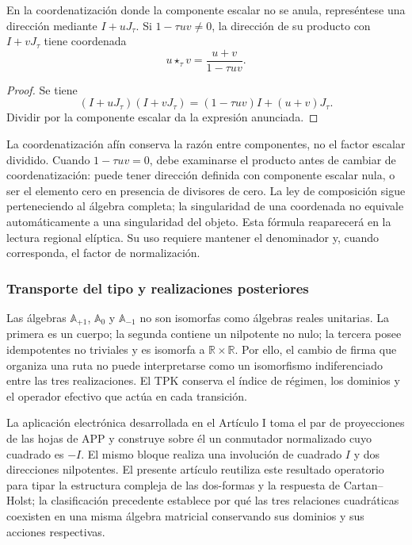 \begin{proposition}
\label{trit-ampl-prop-pendientes}
En la coordenatización donde la componente escalar no se anula, represéntese una
dirección mediante \(I+uJ_\tau\). Si \(1-\tau uv\ne0\), la dirección de su
producto con \(I+vJ_\tau\) tiene coordenada
\[
 u\star_\tau v=\frac{u+v}{1-\tau uv}.
\]
\end{proposition}
\begin{proof}
Se tiene
\[
 (I+uJ_\tau)(I+vJ_\tau)
   =(1-\tau uv)I+(u+v)J_\tau.
\]
Dividir por la componente escalar da la expresión anunciada.
\end{proof}

La coordenatización afín conserva la razón entre componentes, no el factor escalar
dividido. Cuando \(1-\tau uv=0\), debe examinarse el producto antes de
cambiar de coordenatización: puede tener dirección definida con componente escalar
nula, o ser el elemento cero en presencia de divisores de cero. La ley de
composición sigue perteneciendo al álgebra completa; la singularidad de
una coordenada no equivale automáticamente a una singularidad del objeto.
Esta fórmula reaparecerá en la lectura regional elíptica. Su uso requiere
mantener el denominador y, cuando corresponda, el factor de normalización.

\subsubsection{Transporte del tipo y realizaciones posteriores}
\label{trit-ampl-puentes}

Las álgebras \(\mathbb A_{+1}\), \(\mathbb A_0\) y
\(\mathbb A_{-1}\) no son isomorfas como álgebras reales unitarias.
La primera es un cuerpo; la segunda contiene un nilpotente no nulo; la
tercera posee idempotentes no triviales y es isomorfa a
\(\mathbb R\times\mathbb R\). Por ello, el cambio de firma que organiza una
ruta no puede interpretarse como un isomorfismo indiferenciado entre las
tres realizaciones. El TPK conserva el índice de régimen, los dominios y el
operador efectivo que actúa en cada transición.

La aplicación electrónica desarrollada en el Artículo I toma el par de
proyecciones de las hojas de APP y construye sobre él un conmutador
normalizado cuyo cuadrado es \(-I\). El mismo bloque realiza una involución de
cuadrado \(I\) y dos direcciones nilpotentes. El presente artículo reutiliza
este resultado operatorio para tipar la estructura compleja de las dos-formas
y la respuesta de Cartan--Holst; la clasificación precedente establece por
qué las tres relaciones cuadráticas coexisten en una misma álgebra matricial
conservando sus dominios y sus acciones respectivas.


